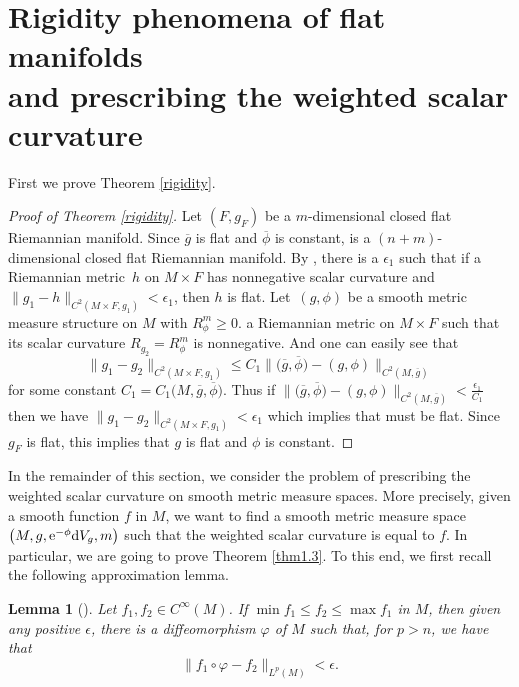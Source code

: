 \documentclass[pdftex]{sigma}
\numberwithin{equation}{section}
\newtheorem{Lemma}[Theorem]{Lemma}
\begin{document}
\section[Rigidity phenomena of flat manifolds and prescribing the weighted scalar curvature]{Rigidity phenomena of flat manifolds\\ and prescribing the weighted scalar curvature}\label{sec5}

First we prove Theorem \ref{rigidity}.

\begin{proof}[Proof of Theorem \ref{rigidity}]
 Let $(F,g_F)$ be a $m$-dimensional closed flat Riemannian manifold. Since $\overline{g}$ is flat and $\overline{\phi}$ is constant,
  is a $(n+m)$-dimensional closed flat Riemannian manifold. By \cite[Theorem~B]{Fischer&Marsden}, there is a $\epsilon_1$ such that if a Riemannian metric~$h$ on $M\times F$ has nonnegative scalar curvature and $\|g_1-h\|_{C^2(M\times F,g_1)}<\epsilon_1$, then $h$ is flat. Let~$(g,\phi)$ be a smooth metric measure structure on $M$ with $R_\phi^m\geq0$.  a Riemannian metric on $M\times F$ such that its scalar curvature $R_{g_2}=R_{\phi}^m$ is nonnegative. And one can easily see that
 \begin{equation*}
 \|g_1-g_2\|_{C^2(M\times F,g_1)}\leq C_1\bigl\|\bigl(\overline{g},\overline{\phi}\bigr)-(g,\phi)\bigr\|_{C^2(M,\overline{g})}
 \end{equation*}
 for some constant $C_1=C_1\bigl(M,\overline{g},\overline{\phi}\bigr)$. Thus if $\bigl\|\bigl(\overline{g},\overline{\phi}\bigr)-(g,\phi)\bigr\|_{C^2(M,\overline{g})}<\frac{\epsilon_1}{C_1}$ then we have $\|g_1-g_2\|_{C^2(M\times F,g_1)}<\epsilon_1$ which implies that  must be flat. Since $g_F$ is flat, this implies that $g$ is flat and $\phi$ is constant.
\end{proof}

In the remainder of this section, we consider the problem of prescribing the weighted scalar curvature on smooth metric measure spaces.
More precisely, given a smooth function $f$ in $M$,
we want to find a smooth metric measure space $\bigl(M, g, {\rm e}^{-\phi}{\rm d}V_g, m\bigr)$ such that the weighted scalar curvature is equal to $f$.
In particular, we are going to prove Theorem \ref{thm1.3}.
To this end, we first recall the following approximation lemma.

\begin{Lemma}[{\cite[Theorem 2.1]{Kazdan&Warner2}}]\label{approxlem}
 Let $f_1, f_2\in C^\infty(M)$. If $\min f_1\leq f_2\leq \max f_1$ in $M$, then given any positive $\epsilon$, there is a diffeomorphism $\varphi$ of $M$ such that, for $p>n$, we have that
\begin{equation*}
 \|f_1\circ\varphi-f_2\|_{L^p(M)}<\epsilon.
\end{equation*}
\end{Lemma}
\end{document}
